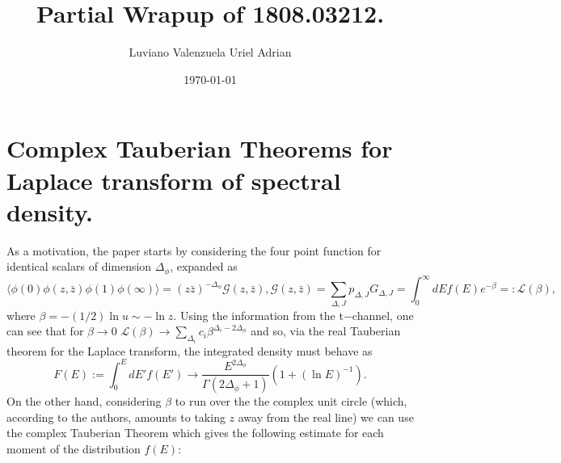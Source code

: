 \documentclass[letterpaper]{article}
\date{\today}
\begin{document}
\title{
  Partial Wrapup of 1808.03212.
  }
\author{
  Luviano Valenzuela Uriel Adrian
}

\newcommand{\inty}{\int_{-\infty}^{\infty}} 
\newcommand{\Lag}{\mathcal{L}} 
\newcommand{\Id}{\mathbb{I}} 
\newcommand{\Tr}{\mathrm{Tr}} 
\newcommand{\tr}{\mathrm{tr}} 
\newcommand{\Det}{\mathrm{Det}} 
\newcommand{\gauge}{\mathcal{A}} 
\newcommand{\Lac}{\ensuremath{\mathbf{\hat{L}^2}}} 
\newcommand{\La}{\ensuremath{\mathbf{\hat{L}}}} 
\newcommand{\Ham}{\ensuremath{\hat{H}}} 
\renewcommand{\a}{\ensuremath{(e_1)}}
\renewcommand{\b}{\ensuremath{(e_2)}}
\renewcommand{\c}{\ensuremath{(e_3)}}
\newcommand\cd{\mathrel{\stackrel{\makebox[0pt]{\mbox{\normalfont\tiny
CD}}}{\longleftrightarrow}}}
\newcommand{\tmop}[1]{\ensuremath{\operatorname{#1}}}
\newcommand{\then}{\ensuremath{\Rightarrow}}
\newcommand{\res}{\ensuremath{\mathrm{Res}}}
\newcommand{\R}{\ensuremath{\mathbb{R}}}
\newcommand{\integral}[1]{\ensuremath{\int_{a}^{b} #1 dt}}
\maketitle


\section{Complex Tauberian Theorems for Laplace transform of spectral density.}

As a motivation, the paper starts by considering the four point function for
identical scalars of dimension $\Delta_\phi$, expanded as
\[
  \langle \phi(0) \phi(z,\bar z) \phi(1) \phi(\infty)\rangle
  =
  (z\bar z)^{-\Delta_\phi} \mathcal{G}(z,\bar z),
\mathcal{G}(z,\bar z)
  =
  \sum_{\Delta,J} p_{\Delta ,J} G_{\Delta, J}
  =
  \int_0^\infty dE f(E) e^{-\beta} =: \mathcal{L}(\beta),
\]
where $\beta = -(1/2)\ln u \sim -\ln z$. Using the information from the t$-$channel, one can see that for $\beta \to 0$ 
$\mathcal{L}(\beta) \to \sum_{\Delta_i} c_i \beta^{\Delta_i-2\Delta_\phi}$ and so, via the real Tauberian
theorem for the Laplace transform, the integrated density must behave as
\[
  F(E) := \int_0^E dE' f(E')\to
  \frac{E^{2\Delta_\phi}}{\Gamma(2\Delta_\phi +1)}
  (1+ (\ln E) ^{-1}).
\]
On the other hand, considering $\beta$ to run over the the complex unit circle
(which, according to the authors, amounts to taking $z$ away from the real line)
we can use the complex Tauberian Theorem which gives the following estimate for
each moment of the distribution $f(E)$:
\end{document}
